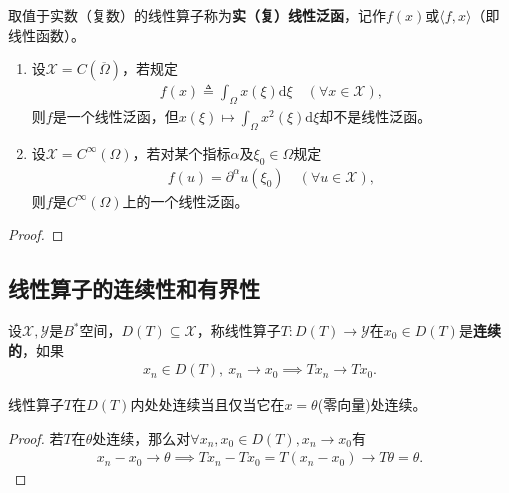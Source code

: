 \documentclass[../../main.tex]{subfiles}%
\begin{document}
\begin{definition}[线性泛函]
取值于实数（复数）的线性算子称为\textbf{实（复）线性泛函}，记作$f(x)$或$\langle f,x\rangle$（即线性函数）。
\end{definition}

\begin{proposition}
\begin{enumerate}[(1)]
\item 设$\mathscr{X}=C(\overline{\Omega})$，若规定
\begin{align*}
f(x)\triangleq \int_\Omega x(\xi)\mathrm{d}\xi\quad (\forall x\in\mathscr{X}),
\end{align*}
则$f$是一个线性泛函，但$x(\xi)\mapsto \int_\Omega x^2(\xi)\mathrm{d}\xi$却不是线性泛函。

\item 设$\mathscr{X}=C^\infty(\Omega)$，若对某个指标$\alpha$及$\xi_0\in\Omega$规定
\begin{align*}
f(u)=\partial^\alpha u(\xi_0)\quad (\forall u\in\mathscr{X}),
\end{align*}
则$f$是$C^\infty(\Omega)$上的一个线性泛函。
\end{enumerate}
\end{proposition}
\begin{proof}


\end{proof}



\subsection{线性算子的连续性和有界性}

\begin{definition}
设$\mathscr{X},\mathscr{Y}$是$B^*$空间，$D(T)\subseteq\mathscr{X}$，称线性算子$T:D(T)\to\mathscr{Y}$在$x_0\in D(T)$是\textbf{连续的}，如果
\begin{align*}
x_n\in D(T),\ x_n\to x_0\implies Tx_n\to Tx_0.
\end{align*}
\end{definition}

\begin{proposition}\label{proposition:线性算子在零元处连续等价于全空间连续}
线性算子$T$在$D(T)$内处处连续当且仅当它在$x=\theta$(零向量)处连续。
\end{proposition}
\begin{proof}

若$T$在$\theta$处连续，那么对$\forall x_n,x_0\in D(T),x_n\to x_0$有
\begin{align*}
x_n-x_0\to\theta\implies Tx_n-Tx_0=T(x_n-x_0)\to T\theta=\theta.
\end{align*}

\end{proof}
\end{document}
